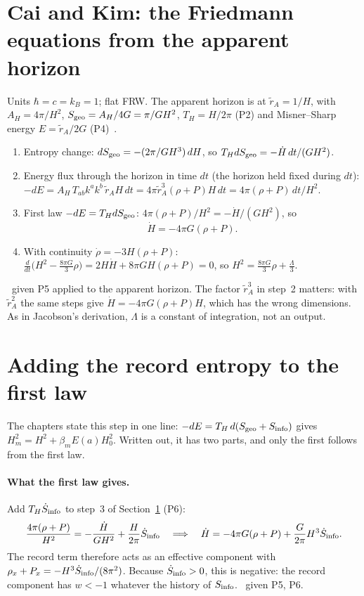 \section{Cai and Kim: the Friedmann equations from the apparent horizon}\label{app:der:caikim}
Units $\hbar=c=k_B=1$; flat FRW. The apparent horizon is at $\tilde r_A=1/H$, with $A_H=4\pi/H^2$, $S_{\rm geo}=A_H/4G=\pi/GH^2$, $T_H=H/2\pi$
(P2) and Misner--Sharp energy $E=\tilde r_A/2G$ (P4)~\cite{CaiKim2005,AkbarCai2007,Hayward1998}.
\begin{enumerate}
\item Entropy change: $dS_{\rm geo}=-(2\pi/GH^3)\,dH$, so $T_HdS_{\rm geo}=-\dot H\,dt/(GH^2)$.
\item Energy flux through the horizon in time $dt$ (the horizon held fixed during $dt$): $-dE=A_H\,T_{ab}k^ak^b\,\tilde r_AH\,dt=4\pi\tilde r_A^3(\rho+P)H\,dt=4\pi(\rho+P)\,dt/H^2$.
\item First law $-dE=T_HdS_{\rm geo}$: $4\pi(\rho+P)/H^2=-\dot H/(GH^2)$, so
\begin{equation}\dot H=-4\pi G(\rho+P). \label{der:F2}\end{equation}
\item With continuity $\dot\rho=-3H(\rho+P)$: $\tfrac{d}{dt}\big(H^2-\tfrac{8\pi G}{3}\rho\big)=2H\dot H+8\pi GH(\rho+P)=0$, so $H^2=\tfrac{8\pi G}{3}\rho+\tfrac\Lambda3$.
\end{enumerate}
\derived\ given P5 applied to the apparent horizon. The factor $\tilde r_A^3$ in step~2 matters: with $\tilde r_A^2$ the same steps give
$\dot H=-4\pi G(\rho+P)H$, which has the wrong dimensions. As in Jacobson's derivation, $\Lambda$ is a constant of integration, not an output.

\section{Adding the record entropy to the first law}\label{app:der:record}
The chapters state this step in one line: $-dE=T_H\,d(S_{\rm geo}+S_{\rm info})$ gives $H_m^2=H^2+\beta_mE(a)H_0^2$. Written out, it has two parts,
and only the first follows from the first law.

\paragraph{What the first law gives.} Add $T_H\dot S_{\rm info}$ to step~3 of Section~\ref{app:der:caikim} (P6):
\begin{equation}
\frac{4\pi(\rho+P)}{H^2}=-\frac{\dot H}{GH^2}+\frac{H}{2\pi}\dot S_{\rm info}
\quad\Longrightarrow\quad
\dot H=-4\pi G(\rho+P)+\frac{G}{2\pi}H^3\dot S_{\rm info}. \label{der:F2info}
\end{equation}
The record term therefore acts as an effective component with $\rho_x+P_x=-H^3\dot S_{\rm info}/(8\pi^2)$. Because $\dot S_{\rm info}>0$, this is negative:
the record component has $w<-1$ whatever the history of $S_{\rm info}$. \derived\ given P5, P6.

